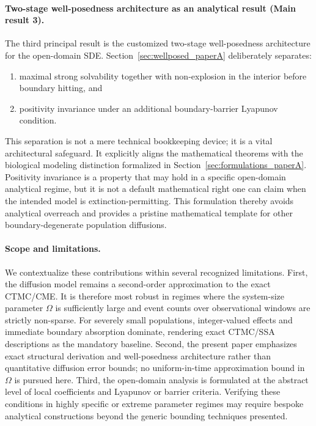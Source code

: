 \documentclass[pdflatex,sn-mathphys-ay]{sn-jnl}
\theoremstyle{thmstyleone}
\theoremstyle{definition}
\theoremstyle{remark}
\begin{document}
\paragraph{Two-stage well-posedness architecture as an analytical result (Main result 3).}
The third principal result is the customized two-stage well-posedness architecture for the open-domain SDE. Section~\ref{sec:wellposed_paperA} deliberately separates:
\begin{enumerate}[label=(\roman*)]
\item maximal strong solvability together with non-explosion in the interior before boundary hitting, and
\item positivity invariance under an additional boundary-barrier Lyapunov condition.
\end{enumerate}
This separation is not a mere technical bookkeeping device; it is a vital architectural safeguard.
It explicitly aligns the mathematical theorems with the biological modeling distinction formalized in Section~\ref{sec:formulations_paperA}.
Positivity invariance is a property that may hold in a specific open-domain analytical regime, 
but it is not a default mathematical right one can claim when the intended model is extinction-permitting. 
This formulation thereby avoids analytical overreach and provides a pristine mathematical template for other boundary-degenerate population diffusions.

\paragraph{Scope and limitations.}
We contextualize these contributions within several recognized limitations.
First, the diffusion model remains a second-order approximation to the exact CTMC/CME. 
It is therefore most robust in regimes where the system-size parameter \(\Omega\) is sufficiently large and event counts over observational windows are strictly non-sparse. 
For severely small populations, integer-valued effects and immediate boundary absorption dominate, 
rendering exact CTMC/SSA descriptions as the mandatory baseline.
Second, the present paper emphasizes exact structural derivation and well-posedness architecture rather than quantitative diffusion error bounds; 
no uniform-in-time approximation bound in \(\Omega\) is pursued here. 
Third, the open-domain analysis is formulated at the abstract level of local coefficients and Lyapunov or barrier criteria.
Verifying these conditions in highly specific or extreme parameter regimes may require bespoke analytical constructions beyond the generic bounding techniques presented.
\end{document}
